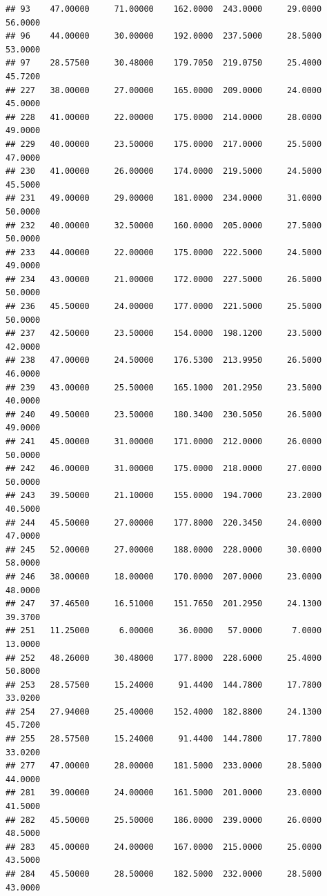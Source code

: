 \documentclass[]{article}
\begin{document}
\begin{verbatim}
## 93    47.00000     71.00000    162.0000  243.0000     29.0000       56.0000
## 96    44.00000     30.00000    192.0000  237.5000     28.5000       53.0000
## 97    28.57500     30.48000    179.7050  219.0750     25.4000       45.7200
## 227   38.00000     27.00000    165.0000  209.0000     24.0000       45.0000
## 228   41.00000     22.00000    175.0000  214.0000     28.0000       49.0000
## 229   40.00000     23.50000    175.0000  217.0000     25.5000       47.0000
## 230   41.00000     26.00000    174.0000  219.5000     24.5000       45.5000
## 231   49.00000     29.00000    181.0000  234.0000     31.0000       50.0000
## 232   40.00000     32.50000    160.0000  205.0000     27.5000       50.0000
## 233   44.00000     22.00000    175.0000  222.5000     24.5000       49.0000
## 234   43.00000     21.00000    172.0000  227.5000     26.5000       50.0000
## 236   45.50000     24.00000    177.0000  221.5000     25.5000       50.0000
## 237   42.50000     23.50000    154.0000  198.1200     23.5000       42.0000
## 238   47.00000     24.50000    176.5300  213.9950     26.5000       46.0000
## 239   43.00000     25.50000    165.1000  201.2950     23.5000       40.0000
## 240   49.50000     23.50000    180.3400  230.5050     26.5000       49.0000
## 241   45.00000     31.00000    171.0000  212.0000     26.0000       50.0000
## 242   46.00000     31.00000    175.0000  218.0000     27.0000       50.0000
## 243   39.50000     21.10000    155.0000  194.7000     23.2000       40.5000
## 244   45.50000     27.00000    177.8000  220.3450     24.0000       47.0000
## 245   52.00000     27.00000    188.0000  228.0000     30.0000       58.0000
## 246   38.00000     18.00000    170.0000  207.0000     23.0000       48.0000
## 247   37.46500     16.51000    151.7650  201.2950     24.1300       39.3700
## 251   11.25000      6.00000     36.0000   57.0000      7.0000       13.0000
## 252   48.26000     30.48000    177.8000  228.6000     25.4000       50.8000
## 253   28.57500     15.24000     91.4400  144.7800     17.7800       33.0200
## 254   27.94000     25.40000    152.4000  182.8800     24.1300       45.7200
## 255   28.57500     15.24000     91.4400  144.7800     17.7800       33.0200
## 277   47.00000     28.00000    181.5000  233.0000     28.5000       44.0000
## 281   39.00000     24.00000    161.5000  201.0000     23.0000       41.5000
## 282   45.50000     25.50000    186.0000  239.0000     26.0000       48.5000
## 283   45.00000     24.00000    167.0000  215.0000     25.0000       43.5000
## 284   45.50000     28.50000    182.5000  232.0000     28.5000       43.0000

\end{verbatim}
\end{document}
